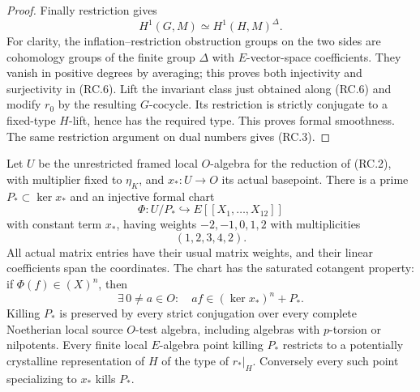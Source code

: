 \begin{proof}
Finally restriction gives
\[
                   H^1(G,M)\simeq H^1(H,M)^\Delta.
 \tag{RC.6}
\]
For clarity, the inflation--restriction obstruction groups
on the two sides are cohomology groups of the finite
group \(\Delta\) with \(E\)-vector-space coefficients.
They vanish in positive degrees by averaging; this proves
both injectivity and surjectivity in (RC.6).
Lift the invariant class just obtained along (RC.6) and
modify \(r_0\) by the resulting \(G\)-cocycle.  Its
restriction is strictly conjugate to a fixed-type
\(H\)-lift, hence has the required type.  This proves
formal smoothness.  The same restriction argument on
dual numbers gives (RC.3).
\end{proof}

\begin{theorem}
\label{AC-G65-local}
Let \(U\) be the unrestricted framed local \(O\)-algebra
for the reduction of (RC.2), with multiplier fixed to
\(\eta_K\), and \(x_*:U\to O\) its actual basepoint.
There is a prime \(P_*\subset\ker x_*\) and an injective
formal chart
\[
 \Phi:U/P_*\hookrightarrow E[[X_1,\ldots,X_{12}]]
 \tag{RC.7}
\]
with constant term \(x_*\), having weights
\(-2,-1,0,1,2\) with multiplicities
\[
                         (1,2,3,4,2).
 \tag{RC.8}
\]
All actual matrix entries have their usual matrix weights,
and their linear coefficients span the coordinates.
The chart has the saturated cotangent property: if
\(\Phi(f)\in(X)^n\), then
\[
 \exists\,0\ne a\in O:\quad
       af\in(\ker x_*)^n+P_*.
 \tag{RC.9}
\]
Killing \(P_*\) is preserved by every strict conjugation
over every complete Noetherian local source \(O\)-test
algebra, including algebras with \(p\)-torsion or
nilpotents.  Every finite local \(E\)-algebra point
killing \(P_*\) restricts to a potentially crystalline
representation of \(H\) of the type of \(r_*|_H\).
Conversely every such point specializing to \(x_*\)
kills \(P_*\).
\end{theorem}
